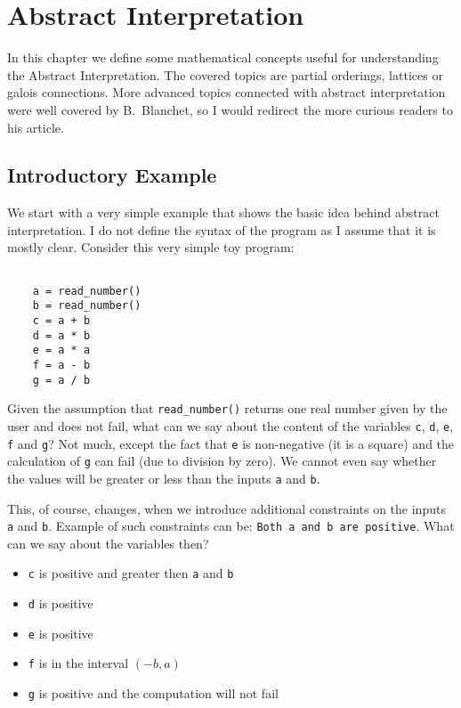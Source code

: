 \chapter{Abstract Interpretation}

In this chapter we define some mathematical concepts useful for understanding the Abstract Interpretation.
The covered topics are partial orderings, lattices or galois connections.
More advanced topics connected with abstract interpretation were well covered by B.~Blanchet\cite{Blanchet:2002:AI},
so I would redirect the more curious readers to his article.


\section{Introductory Example} %

We start with a very simple example that shows the basic idea behind abstract interpretation.
I do not define the syntax of the program as I assume that it is mostly clear. %
Consider this very simple toy program:

\begin{verbatim}

    a = read_number()
    b = read_number()
    c = a + b
    d = a * b
    e = a * a
    f = a - b
    g = a / b

\end{verbatim}

Given the assumption that \verb|read_number()| returns one real number given by the user and does not fail, what can
we say about the content of the variables \verb|c|, \verb|d|, \verb|e|, \verb|f| and \verb|g|?
Not much, except the fact that \verb|e| is non-negative (it is a square) and the calculation of \verb|g| can fail
(due to division by zero).
We cannot even say whether the values will be greater or less than the inputs \verb|a| and \verb|b|.

This, of course, changes, when we introduce additional constraints on the inputs \verb|a| and \verb|b|.
Example of such constraints can be: \verb|Both a and b are positive|.
What can we say about the variables then?
\begin{itemize}
    \item \verb|c| is positive and greater then \verb|a| and \verb|b|
    \item \verb|d| is positive
    \item \verb|e| is positive
    \item \verb|f| is in the interval $(-b, a)$
    \item \verb|g| is positive and the computation will not fail
\end{itemize}

